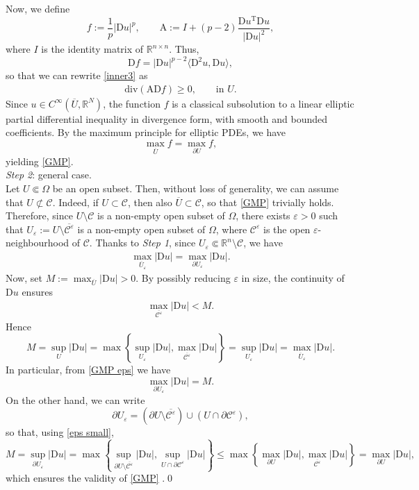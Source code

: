 \documentclass[a4paper,11pt]{article}
\numberwithin{equation}{section}
\newcommand{\numberset}{\mathbb}
\newcommand{\eps}{\varepsilon}
\newcommand{\Om}{\Omega}
\newcommand{\R}{\numberset{R}}
\newcommand{\rom}{\mathrm}
\theoremstyle{definition}
\begin{document}
Now, we define 
$$
f:=\frac1p{|\rom Du|^p}, \qquad \rom A:= I+(p-2)\frac{\rom Du^\rom T\rom Du}{|\rom Du|^2},
$$
where $I$ is the identity matrix of $\R^{n\times n}$. Thus, 
$$
\rom Df=|\rom Du|^{p-2}\langle\rom D^2u, \rom Du\rangle,
$$
so that we can rewrite \eqref{inner3} as
\begin{equation}\label{inner4}
\begin{aligned}
\rom{div}(\rom A\rom Df)\geq0, \qquad\mbox{in }U.
\end{aligned}
\end{equation}
Since $u\in C^\infty(\overline U,\R^N)$, the function $f$ is a classical subsolution to a linear elliptic partial differential inequality in divergence form, with smooth and bounded coefficients. By the maximum principle for elliptic PDEs, we have
$$
\max_{\overline U}f=\max_{\partial U}f,
$$
yielding \eqref{GMP}.\\

\noindent
\textit{Step 2}: general case.\\
Let $U\Subset\Om$ be an open subset. Then, without loss of generality, we can assume that $U\not\subset\mathscr C$. Indeed, if $U\subset\mathscr C$, then also $\overline U\subset\mathscr C$, so that \eqref{GMP} trivially holds. Therefore, since $U\setminus \mathscr C$ is a non-empty open subset of $\Om$, there exists $\eps>0$ such that $U_\eps:=U\setminus\overline{\mathscr C^\eps}$ is a non-empty open subset of $\Om$, where ${\mathscr C^\eps}$ is the open $\eps$-neighbourhood of ${\mathscr C}$. Thanks to \textit{Step 1}, since $U_\eps\Subset\R^n\setminus \mathscr C$, we have
\begin{align}\label{GMP eps}
\max_{\overline U_\eps}|\rom Du|=\max_{\partial U_\eps}|\rom Du|.
\end{align}
Now, set $M:=\max_{\overline U}|\rom Du|>0$. By possibly reducing $\eps$ in size, the continuity of $\rom Du$ ensures
\begin{align}\label{eps small}
\max_{\overline{\mathscr C^\eps}}|\rom Du|< M.
\end{align}
Hence
$$
M=\sup_{U}|\rom Du|=\max\left\{\sup_{U_\eps}|\rom Du|,\max_{\overline{\mathscr C^\eps}}|\rom Du| \right\}=\sup_{U_\eps}|\rom Du|= \max_{ \overline{U}_\eps}|\rom Du|.
$$
In particular, from \eqref{GMP eps} we have
$$
\max_{\partial U_\eps}|\rom Du|=M.
$$
On the other hand, we can write
$$
\partial U_\eps=(\partial U\setminus\overline{\mathscr C^\eps})\cup (U\cap \partial{\mathscr C^\eps}),
$$
so that, using \eqref{eps small}, 
$$
M=\sup_{\partial U_\eps}|\rom Du|=\max\left\{\sup_{\partial U\setminus\overline{\mathscr C^\eps}}|\rom Du|, \sup_{U\cap \partial{\mathscr C^\eps}}|\rom Du|\right\}\leq\max\left\{\max_{\partial U}|\rom Du|, \max_{ \overline{\mathscr C^\eps}}|\rom Du|\right\}=\max_{\partial U}|\rom Du|,
$$
which ensures the validity of \eqref{GMP} .\qed\\
\end{document}
